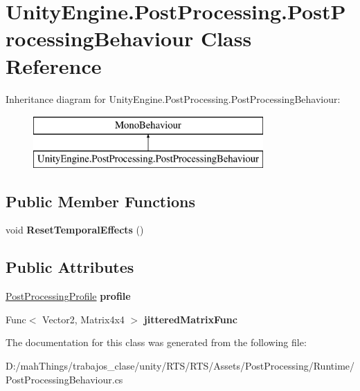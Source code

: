 \hypertarget{class_unity_engine_1_1_post_processing_1_1_post_processing_behaviour}{}\section{Unity\+Engine.\+Post\+Processing.\+Post\+Processing\+Behaviour Class Reference}
\label{class_unity_engine_1_1_post_processing_1_1_post_processing_behaviour}
Inheritance diagram for Unity\+Engine.\+Post\+Processing.\+Post\+Processing\+Behaviour\+:\begin{figure}[H]
\begin{center}
\leavevmode
\includegraphics[height=2.000000cm]{class_unity_engine_1_1_post_processing_1_1_post_processing_behaviour}
\end{center}
\end{figure}
\subsection*{Public Member Functions}
\begin{DoxyCompactItemize}
\item 
\mbox{\label{class_unity_engine_1_1_post_processing_1_1_post_processing_behaviour_a12cc91b85fedc39bf7d777a2c4d49f17}} 
void {\bfseries Reset\+Temporal\+Effects} ()
\end{DoxyCompactItemize}
\subsection*{Public Attributes}
\begin{DoxyCompactItemize}
\item 
\mbox{\label{class_unity_engine_1_1_post_processing_1_1_post_processing_behaviour_a34c4569526dd0e87af574653c99ab1db}} 
\mbox{\hyperlink{class_unity_engine_1_1_post_processing_1_1_post_processing_profile}{Post\+Processing\+Profile}} {\bfseries profile}
\item 
\mbox{\label{class_unity_engine_1_1_post_processing_1_1_post_processing_behaviour_a8cd98b27f5b575670763aeca458e2547}} 
Func$<$ Vector2, Matrix4x4 $>$ {\bfseries jittered\+Matrix\+Func}
\end{DoxyCompactItemize}


The documentation for this class was generated from the following file\+:\begin{DoxyCompactItemize}
\item 
D\+:/mah\+Things/trabajos\+\_\+clase/unity/\+R\+T\+S/\+R\+T\+S/\+Assets/\+Post\+Processing/\+Runtime/Post\+Processing\+Behaviour.\+cs\end{DoxyCompactItemize}
